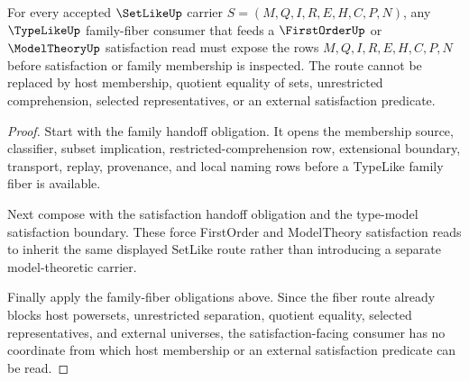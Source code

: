 \begin{theorem}
\label{thm:setlike-family-fiber-model-satisfaction-route}
For every accepted $\SetLikeUp$ carrier $S=(M,Q,I,R,E,H,C,P,N)$, any $\TypeLikeUp$ family-fiber consumer that feeds a $\FirstOrderUp$ or $\ModelTheoryUp$ satisfaction read must expose the rows $M,Q,I,R,E,H,C,P,N$ before satisfaction or family membership is inspected. The route cannot be replaced by host membership, quotient equality of sets, unrestricted comprehension, selected representatives, or an external satisfaction predicate.
\end{theorem}
\begin{proof}
Start with the family handoff obligation. It opens the membership source, classifier, subset implication, restricted-comprehension row, extensional boundary, transport, replay, provenance, and local naming rows before a TypeLike family fiber is available.

Next compose with the satisfaction handoff obligation and the type-model satisfaction boundary. These force FirstOrder and ModelTheory satisfaction reads to inherit the same displayed SetLike route rather than introducing a separate model-theoretic carrier.

Finally apply the family-fiber obligations above. Since the fiber route already blocks host powersets, unrestricted separation, quotient equality, selected representatives, and external universes, the satisfaction-facing consumer has no coordinate from which host membership or an external satisfaction predicate can be read.
\end{proof}


